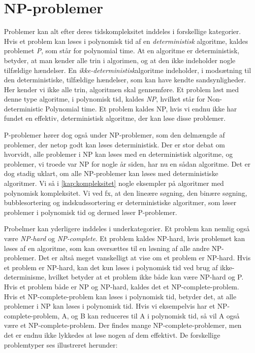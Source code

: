 \section{NP-problemer} \label{kap:np}
Problemer kan alt efter deres tidskompleksitet inddeles i forskellige kategorier. Hvis et problem kan løses i polynomisk tid af en \emph{deterministisk} algoritme, kaldes problemet \emph{P}, som står for polynomial time.
At en algoritme er deterministisk, betyder, at man kender alle trin i algorimen, og at den ikke indeholder nogle tilfældige hændelser. En \emph{ikke-deterministisk}algoritme indeholder, i modsætning til den deterministiske, tilfældige hændelser, som kan have kendte sandsynligheder. Her kender vi ikke alle trin, algoritmen skal gennemføre. Et problem løst med denne type algoritme, i polynomisk tid, kaldes \emph{NP}, hvilket står for Non-deterministic Polynomial time. Et problem kaldes NP, hvis vi endnu ikke har fundet en effektiv, deterministisk algoritme, der kan løse disse problemer. 

P-problemer hører dog også under NP-problemer, som den delmængde af problemer, der netop godt kan løses deterministisk. 
Der er stor debat om hvorvidt, alle problemer i NP kan løses med en deterministisk algoritme, og problemer, vi troede var NP for nogle år siden, har nu en sådan algoritme. Det er dog stadig uklart, om alle NP-problemer kan løses med deterministiske algoritmer.
Vi så i \autoref{kap:kompleksitet} nogle eksempler på algoritmer med polynomisk kompleksitet. Vi ved fx, at den lineære søgning, den binære søgning, bubblesortering og indskudssortering er deterministiske algoritmer, som løser problemer i polynomisk tid og dermed løser P-problemer.

Probelmer kan yderligere inddeles i underkategorier. Et problem kan nemlig også være \emph{NP-hard} og \emph{NP-complete}. Et problem kaldes NP-hard, hvis problemet kan løses af en algoritme, som kan oversættes til en løsning af alle andre NP-problemer. Det er altså meget vanskelligt at vise om et problem er NP-hard. Hvis et problem er NP-hard, kan det kun løses i polynomisk tid ved brug af ikke-determinisme, hvilket betyder at et problem ikke både kan være NP-hard og P.
Hvis et problem både er NP og NP-hard, kaldes det et NP-complete-problem. Hvis et NP-complete-problem kan løses i polynomisk tid, betyder det, at alle problemer i NP kan løses i polynomisk tid. Hvis vi eksempelvis har et NP-complete-problem, A, og B kan reduceres til A i polynomisk tid, så vil A også være et NP-complete-problem. Der findes mange NP-complete-problemer, men det er endnu ikke lykkedes at løse nogen af dem effektivt. De forskellige problemtyper ses illustreret herunder:

